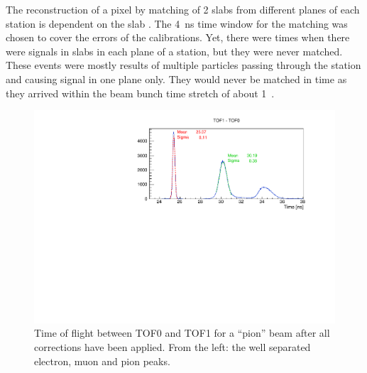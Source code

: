 The reconstruction of a pixel by matching of 2 slabs from different
planes of each station is dependent on the slab \DT{}. The 4~ns time
window for the matching was chosen to cover the errors of the
calibrations. Yet, there were times when there were signals in slabs
in each plane of a station, but they were never matched. These events
were mostly results of multiple particles passing through the station
and causing signal in one plane only. They would never be matched in
time as they arrived within the beam bunch time stretch of about
1~\us{}.


\begin{figure}[!htb]
  \begin{center}
    \includegraphics[width=0.6\columnwidth]{TOF_peaks.pdf}
    \caption{Time of flight between TOF0 and TOF1 for a ``pion'' beam
      after all corrections have been applied. From the left: the well
      separated electron, muon and pion peaks.}
    \label{fig:TOF_peaks}
  \end{center}
\end{figure}












